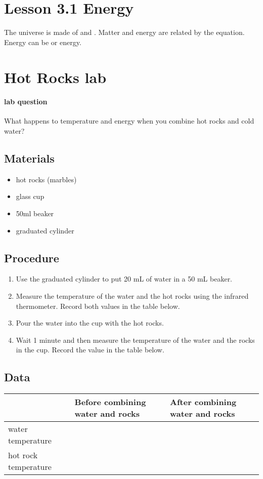 \documentclass[12pt, answers]{exam}
\begin{document}
\section*{Lesson 3.1 Energy}

\begin{questions}
    \question The universe is made of \fillin[matter] and \fillin[energy].
    \question Matter and energy are related by the \fillin[$E=mc^2$] equation.
    \question Energy can be \fillin[potential] or \fillin[kenetic] energy.





\end{questions}

\section*{Hot Rocks lab}

\paragraph{lab question} What happens to temperature and energy when you combine hot rocks and cold water?

\subsection*{Materials}

\begin{itemize}
    \item hot rocks (marbles)
    \item glass cup
    \item 50ml beaker
    \item graduated cylinder
\end{itemize}

\subsection*{Procedure}

\begin{enumerate}
    \item Use the graduated cylinder to put 20 mL of water in a 50 mL beaker.
    \item Measure the temperature of the water and the hot rocks using the infrared thermometer. Record both values in the table below.
    \item Pour the water into the cup with the hot rocks.
    \item Wait 1 minute and then measure the temperature of the water and the rocks in the cup. Record the value in the table below.
\end{enumerate}

\subsection*{Data}

\begin{tabular}{|p{4cm}|p{4cm}|p{4cm}|}
    \hline
    \quad & Before combining water and rocks & After combining water and rocks \\
    \hline
    water temperature & \quad & \quad \\
    \hline
    hot rock temperature & \quad & \quad \\
    \hline
\end{tabular}

    
\end{document}
